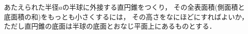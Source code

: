 \documentclass[../../main.tex]{subfiles}
\begin{document}
あたえられた半径$a$の半球に外接する直円錐をつくり，
その全表面積(側面積と底面積の和)をもっとも小さくするには，
その高さをなにほどにすればよいか，
ただし直円錐の底面は半球の底面とおなじ平面上にあるものとする．
\end{document}

